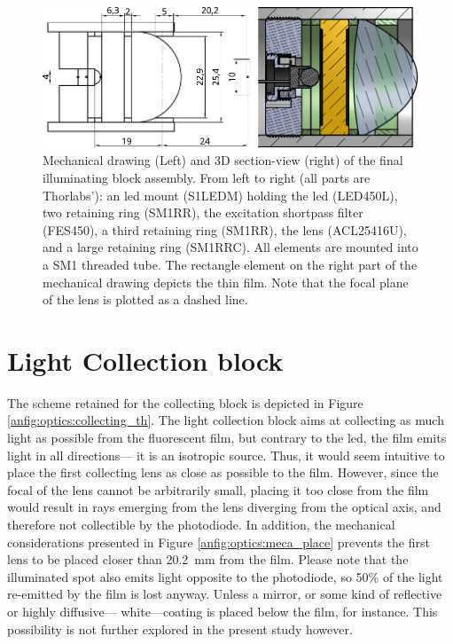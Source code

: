 \begin{figure}[h!]
	\centering
	\includegraphics{2_appendices/optical_figures/illuminating_meca}
	\caption[Mechanical drawing (Left) and 3D section-view (right) of the final illuminating block assembly.]{Mechanical drawing (Left) and 3D section-view (right) of the final illuminating block assembly. From left to right (all parts are Thorlabs'): an \gls{led} mount (S1LEDM) holding the \gls{led} (LED450L), two retaining ring (SM1RR), the excitation shortpass filter (FES450), a third retaining ring (SM1RR), the lens (ACL25416U), and a large retaining ring (SM1RRC). All elements are mounted into a SM1 threaded tube. The rectangle element on the right part of the mechanical drawing depicts the thin film. Note that the focal plane of the lens is plotted as a dashed line.}
	\label{anfig:optics:illuminating_meca}
\end{figure}

\section{Light Collection block}

The scheme retained for the collecting block is depicted in Figure \ref{anfig:optics:collecting_th}. The light collection block aims at collecting as much light as possible from the fluorescent film, but contrary to the \gls{led}, the film emits light in all directions---\ie{} it is an isotropic source. Thus, it would seem intuitive to place the first collecting lens as close as possible to the film. However, since the focal of the lens cannot be arbitrarily small, placing it too close from the film would result in rays emerging from the lens diverging from the optical axis, and therefore not collectible by the photodiode. In addition, the mechanical considerations presented in Figure \ref{anfig:optics:meca_place} prevents the first lens to be placed closer than 20.2~mm from the film. Please note that the illuminated spot also emits light opposite to the photodiode, so 50\% of the light re-emitted by the film is lost anyway. Unless a mirror, or some kind of reflective or highly diffusive---\ie{} white---coating is placed below the film, for instance. This possibility is not further explored in the present study however.

